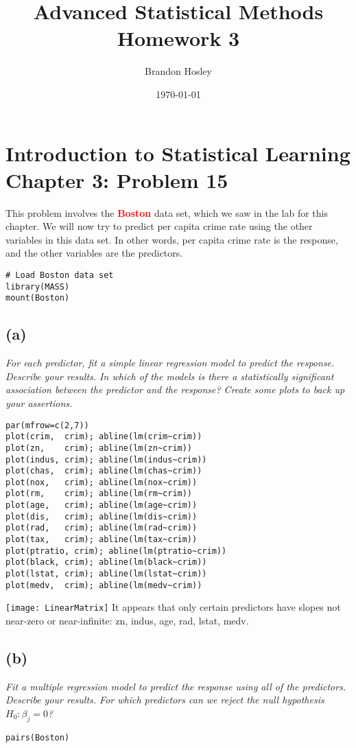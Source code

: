 \documentclass[a4paper,man,natbib]{apa6}
\title{Advanced Statistical Methods Homework 3}
\author{Brandon Hosley}
\date{\today}
\affiliation{University of Illinois - Springfield}
\begin{document}
\maketitle
\singlespacing

\section{Introduction to Statistical Learning \\ Chapter 3: Problem 15}
This problem involves the \textbf{\textcolor{red}{Boston}} data set, 
which we saw in the lab for this chapter. 
We will now try to predict per capita crime rate
using the other variables in this data set. 
In other words, per capita crime rate is the response, 
and the other variables are the predictors.

\begin{verbatim}
# Load Boston data set
library(MASS)
mount(Boston)
\end{verbatim}

\subsection{(a)} 
\emph{
	For each predictor, 
	fit a simple linear regression model to predict the response. 
	Describe your results. 
	In which of the models is there a statistically significant association
	between the predictor and the response? 
	Create some plots to back up your assertions.}
\begin{verbatim}
par(mfrow=c(2,7))
plot(crim,  crim); abline(lm(crim~crim)) 
plot(zn,    crim); abline(lm(zn~crim)) 
plot(indus, crim); abline(lm(indus~crim)) 
plot(chas,  crim); abline(lm(chas~crim))
plot(nox,   crim); abline(lm(nox~crim)) 
plot(rm,    crim); abline(lm(rm~crim))  
plot(age,   crim); abline(lm(age~crim))  
plot(dis,   crim); abline(lm(dis~crim))  
plot(rad,   crim); abline(lm(rad~crim))  
plot(tax,   crim); abline(lm(tax~crim))    
plot(ptratio, crim); abline(lm(ptratio~crim))
plot(black, crim); abline(lm(black~crim))
plot(lstat, crim); abline(lm(lstat~crim))
plot(medv,  crim); abline(lm(medv~crim))
\end{verbatim}
\texttt{[image: LinearMatrix]}
It appears that only certain predictors have slopes not near-zero or near-infinite:
zn, indus, age, rad, lstat, medv.

\subsection{(b)}
\emph{
	Fit a multiple regression model to predict the 
	response using all of the predictors. 
	Describe your results. 
	For which predictors can we reject the null hypothesis 
	$H_0 : \beta_j = 0$?
}
\begin{verbatim}
pairs(Boston)
\end{verbatim}
\end{document}
